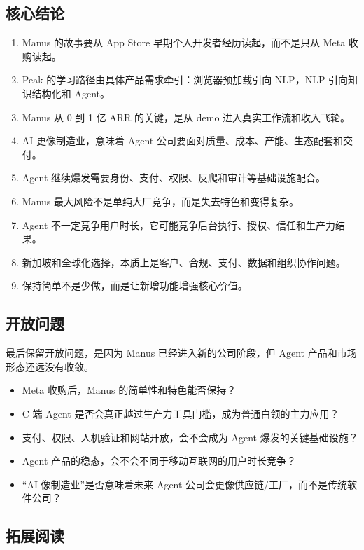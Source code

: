 \documentclass[a4paper]{article}
\begin{document}
\subsection{核心结论}

\begin{enumerate}
\item Manus 的故事要从 App Store 早期个人开发者经历读起，而不是只从 Meta 收购读起。
\item Peak 的学习路径由具体产品需求牵引：浏览器预加载引向 NLP，NLP 引向知识结构化和 Agent。
\item Manus 从 0 到 1 亿 ARR 的关键，是从 demo 进入真实工作流和收入飞轮。
\item AI 更像制造业，意味着 Agent 公司要面对质量、成本、产能、生态配套和交付。
\item Agent 继续爆发需要身份、支付、权限、反爬和审计等基础设施配合。
\item Manus 最大风险不是单纯大厂竞争，而是失去特色和变得复杂。
\item Agent 不一定竞争用户时长，它可能竞争后台执行、授权、信任和生产力结果。
\item 新加坡和全球化选择，本质上是客户、合规、支付、数据和组织协作问题。
\item 保持简单不是少做，而是让新增功能增强核心价值。
\end{enumerate}

\subsection{开放问题}

最后保留开放问题，是因为 Manus 已经进入新的公司阶段，但 Agent 产品和市场形态还远没有收敛。

\begin{itemize}
\item Meta 收购后，Manus 的简单性和特色能否保持？
\item C 端 Agent 是否会真正越过生产力工具门槛，成为普通白领的主力应用？
\item 支付、权限、人机验证和网站开放，会不会成为 Agent 爆发的关键基础设施？
\item Agent 产品的稳态，会不会不同于移动互联网的用户时长竞争？
\item “AI 像制造业”是否意味着未来 Agent 公司会更像供应链/工厂，而不是传统软件公司？
\end{itemize}

\subsection{拓展阅读}
\end{document}
